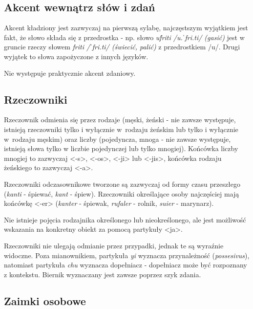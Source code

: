 \subsection{Akcent wewnątrz słów i zdań}

Akcent kładziony jest zazwyczaj na pierwszą sylabę, najczęstszym wyjątkiem jest 
fakt, że słowo składa się z przedrostka - np. słowo \emph{uf́riti /u.ˈfri.ti/ 
(gasić)} jest w gruncie rzeczy słowem \emph{friti /ˈfri.ti/ (świecić, palić)} 
z przedrostkiem /u/. Drugi wyjątek to słowa zapożyczone z innych języków.

Nie występuje praktycznie akcent zdaniowy.

\subsection{Rzeczowniki}
Rzeczownik odmienia się przez rodzaje (męski, żeński - nie zawsze występuje, 
istnieją rzeczowniki tylko i wyłącznie w~rodzaju żeńskim lub tylko i wyłącznie 
w~rodzaju męskim) oraz liczby (pojedyncza, mnoga - nie zawsze występuje, 
istnieją słowa tylko w liczbie pojedynczej lub tylko mnogiej). Końcówka liczby 
mnogiej to zazwyczaj <-s>, <-os>, <-ji> lub <-jis>, końcówka rodzaju żeńskiego 
to zazwyczaj <-a>.

Rzeczowniki odczasownikowe tworzone są zazwyczaj od formy czasu przeszłego 
(\emph{kanti} - śpiewać, \emph{kant} - śpiew). Rzeczowniki określające osoby 
najczęściej mają końcówkę <-er> (\emph{kanter} - śpiewak, \emph{rufaler} - 
rolnik, \emph{suier} - marynarz).

Nie istnieje pojęcia rodzajnika określonego lub nieokreślonego, ale jest 
możliwość wskazania na konkretny obiekt za pomocą partykuły <ja>.


Rzeczowniki nie ulegają odmianie przez przypadki, jednak te są wyraźnie 
widoczne. Poza mianownikiem, partykuła \emph{yi} wyznacza przynależność 
(\emph{possesivus}), natomiast partykuła \emph{chu} wyznacza dopełniacz - 
dopełniacz może być rozpoznany z kontekstu. Biernik wyznaczany jest zawsze 
poprzez szyk zdania.


\subsection{Zaimki osobowe}

